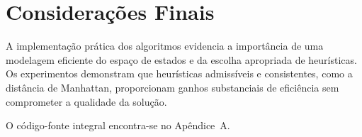 \section{Considerações Finais}  
A implementação prática dos algoritmos evidencia a importância de uma modelagem eficiente do espaço de estados e da escolha apropriada de heurísticas. Os experimentos demonstram que heurísticas admissíveis e consistentes, como a distância de Manhattan, proporcionam ganhos substanciais de eficiência sem comprometer a qualidade da solução.  
  
O código-fonte integral encontra-se no Apêndice~A.  
